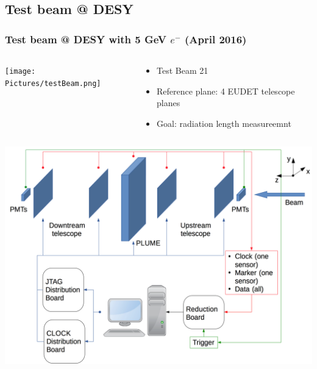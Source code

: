 \documentclass{beamer}
\begin{document}
    \subsection{Test beam @ DESY}

    \begin{frame}
      \frametitle{Test beam @ DESY with 5 GeV $e^-$ (April 2016)}
      
      \begin{columns}[c]
        \begin{column}{5cm}
          \begin{center}
            \texttt{[image: Pictures/testBeam.png]}
          \end{center}
        \end{column}
        \begin{column}{5cm}
          \begin{itemize}
            \item Test Beam 21
            \item Reference plane: 4 EUDET telescope planes
            \item Goal: radiation length measureemnt
          \end{itemize}
        \end{column}
      \end{columns}
    \end{frame}

    \begin{frame}

      \begin{center}
        \includegraphics[width = \textwidth]{Pictures/testBeamAcquisition.png}
      \end{center}
    \end{frame}
\end{document}

